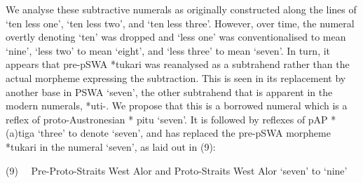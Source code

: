 We analyse these subtractive numerals as originally constructed along the lines of {\textquoteleft}ten less one{\textquoteright}, {\textquoteleft}ten less two{\textquoteright}, and {\textquoteleft}ten less three{\textquoteright}. However, over time, the numeral overtly denoting {\textquoteleft}ten{\textquoteright} was dropped and {\textquoteleft}less one{\textquoteright} was conventionalised to mean {\textquoteleft}nine{\textquoteright}, {\textquoteleft}less two{\textquoteright} to mean {\textquoteleft}eight{\textquoteright}, and {\textquoteleft}less three{\textquoteright} to mean {\textquoteleft}seven{\textquoteright}. In turn, it appears that pre-pSWA *tukari was reanalysed as a subtrahend rather than the actual morpheme expressing the subtraction. This is seen in its replacement by another base in PSWA {\textquoteleft}seven{\textquoteright}, the other subtrahend that is apparent in the modern numerals, *{\texthtb}uti-. We propose that this is a borrowed numeral which is a reflex of proto-Austronesian *
pitu {\textquoteleft}seven{\textquoteright}. It is followed by reflexes of pAP *(a)tiga {\textquoteleft}three{\textquoteright} to denote {\textquoteleft}seven{\textquoteright}, and has replaced the pre-pSWA morpheme *tukari in the numeral {\textquoteleft}seven{\textquoteright}, as laid out in (9):

(9)  \ \ Pre-Proto-Straits West Alor and Proto-Straits West Alor {\textquoteleft}seven{\textquoteright} to {\textquoteleft}nine{\textquoteright}

